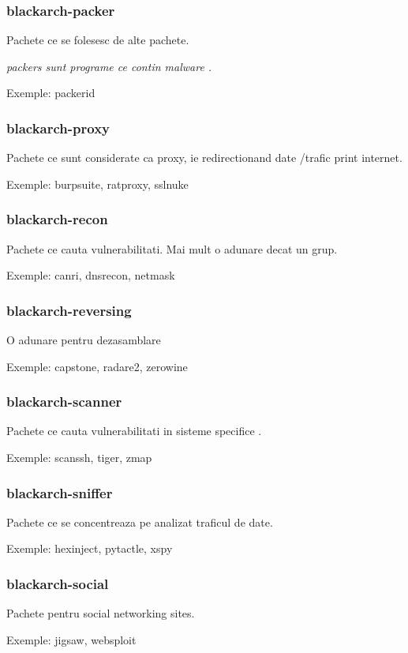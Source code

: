 \documentclass[a4paper, oneside, 11pt]{book}
\begin{document}
\subsubsection{blackarch-packer}
Pachete ce se folesesc de alte pachete.

\textit{packers sunt programe ce contin malware .}

Exemple: packerid

\subsubsection{blackarch-proxy}
Pachete ce sunt considerate ca proxy, ie redirectionand date /trafic
print internet.

Exemple: burpsuite, ratproxy, sslnuke

\subsubsection{blackarch-recon}
Pachete ce cauta vulnerabilitati. Mai mult o adunare decat un grup.

Exemple: canri, dnsrecon, netmask

\subsubsection{blackarch-reversing}
O adunare pentru dezasamblare

Exemple: capstone, radare2, zerowine

\subsubsection{blackarch-scanner}
Pachete ce cauta vulnerabilitati in sisteme specifice .

Exemple: scanssh, tiger, zmap

\subsubsection{blackarch-sniffer}
Pachete ce se concentreaza pe analizat traficul de date.

Exemple: hexinject, pytactle, xspy

\subsubsection{blackarch-social}
Pachete pentru social networking sites.

Exemple: jigsaw, websploit
\end{document}
